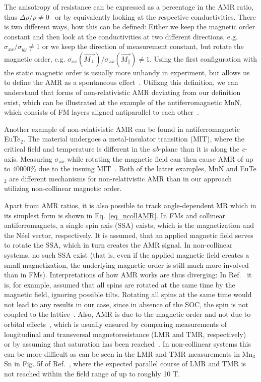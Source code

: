 \documentclass[prb,showpacs,amsmath,amssymb,superscriptaddress,twocolumn,floatfix]{revtex4-1}
\begin{document}
The anisotropy of resistance can be expressed as a percentage in the AMR ratio, thus $\Delta \rho / \rho \neq 0$~\cite{Ritzinger:2023} or by equivalently looking at the respective conductivities. There is two different ways, how this can be defined: Either we keep the magnetic order constant and then look at the conductivities at two different directions, e.g. $\sigma_{xx} / \sigma_{yy} \neq 1$ or we keep the direction of measurement constant, but rotate the magnetic order, e.g. $\sigma_{xx} (\vec{M_\perp})  / \sigma_{xx} (\vec{M_\parallel}) \neq 1$. Using the first configuration with the static magnetic order is usually more unhandy in experiment, but allows us to define the AMR as a spontaneous effect~\cite{Bakonyi:2022}. Utilizng this definition, we can understand that forms of non-relativistic AMR deviating from our definition exist, which can be illustrated at the example of the antiferromagnetic MnN, which consists of FM layers aligned antiparallel to each other~\cite{Dunz:2020}.

Another example of non-relativistic AMR can be found in antiferromagnetic EuTe$_2$. The material undergoes a metal-insulator transition (MIT), where the critical field and temperature is different in the \textit{ab}-plane than it is along the \textit{c}-axis. Measuring $\sigma_{xx}$ while rotating the magnetic field can then cause AMR of up to $40000\%$ due to the insuing MIT~\cite{Yang:2021}. Both of the latter examples, MnN and EuTe$_2$ are different mechanisms for non-relativistic AMR than in our approach utilizing non-collinear magnetic order.

Apart from AMR ratios, it is also possible to track angle-dependent MR which in its simplest form is shown in Eq.~\ref{eq_ncollAMR}. In FMs and collinear antiferromagnets, a single spin axis (SSA) exists, which is the magnetization and the N\'eel vector, respectively. It is assumed, that an applied magnetic field serves to rotate the SSA, which in turn creates the AMR signal. In non-collinear systems, no such SSA exist (that is, even if the applied magnetic field creates a small magnetization, the underlying magnetic order is still much more involved than in FMs). Interpretations of how AMR works are thus diverging: In Ref.~ it is, for example, assumed that all spins are rotated at the same time by the magnetic field, ignoring possible tilts. Rotating all spins at the same time would not lead to any results in our case, since in absence of the SOC, the spin is not coupled to the lattice~\cite{Gonzalez-Hernandez:2024}. Also, AMR is due to the magnetic order and not due to orbital effects~\cite{Ritzinger:2023}, which is usually ensured by comparing measurements of longitudinal and transversal magnetoresistance (LMR and TMR, respectively)~\cite{Bakonyi:2022} or by assuming that saturation has been reached~\cite{Ritzinger:2021}. In non-collinear systems this can be more difficult as can be seen in the LMR and TMR measurements in Mn$_3$Sn in Fig. 5f of Ref.~, where the expected parallel course of LMR and TMR is not reached within the field range of up to roughly 10 T.
\end{document}
